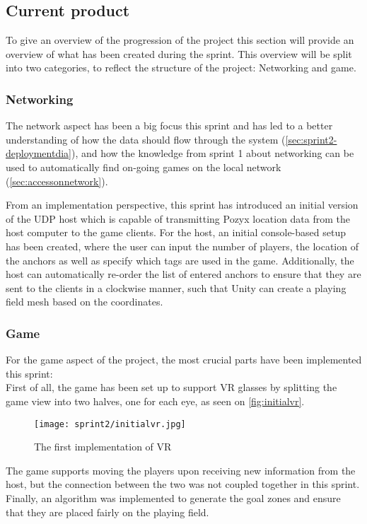 \subsection{Current product}
To give an overview of the progression of the project this section will provide an overview of what has been created during the sprint.
This overview will be split into two categories, to reflect the structure of the project: Networking and game.

\subsubsection{Networking}
The network aspect has been a big focus this sprint and has led to a better understanding of how the data should flow through the system (\autoref{sec:sprint2-deploymentdia}), and how the knowledge from sprint 1 about networking can be used to automatically find on-going games on the local network (\autoref{sec:accessonnetwork}).

From an implementation perspective, this sprint has introduced an initial version of the UDP host which is capable of transmitting Pozyx location data from the host computer to the game clients.
For the host, an initial console-based setup has been created, where the user can input the number of players, the location of the anchors as well as specify which tags are used in the game.
Additionally, the host can automatically re-order the list of entered anchors to ensure that they are sent to the clients in a clockwise manner, such that Unity can create a playing field mesh based on the coordinates.

\subsubsection{Game}
For the game aspect of the project, the most crucial parts have been implemented this sprint:\\
First of all, the game has been set up to support VR glasses by splitting the game view into two halves, one for each eye, as seen on \autoref{fig:initialvr}.

\begin{figure}[H]
	\centering
	\texttt{[image: sprint2/initialvr.jpg]}
	\caption{The first implementation of VR}
	\label{fig:initialvr}
\end{figure}
\noindent
The game supports moving the players upon receiving new information from the host, but the connection between the two was not coupled together in this sprint.
Finally, an algorithm was implemented to generate the goal zones and ensure that they are placed fairly on the playing field.
